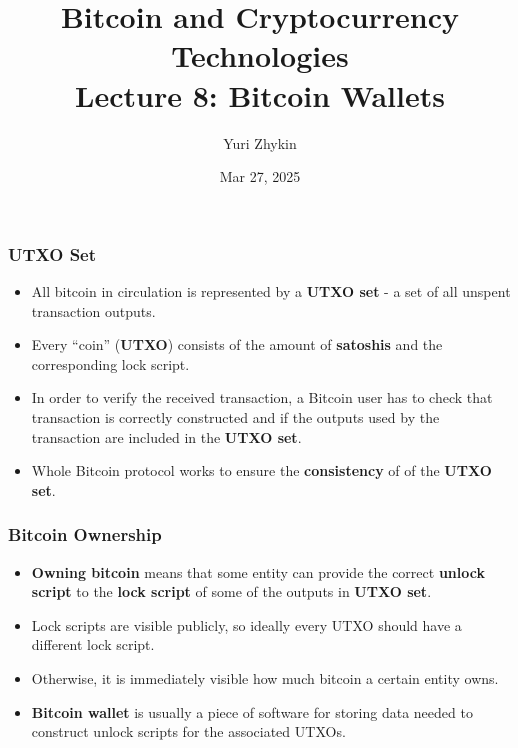 \documentclass{beamer}
\title{
  Bitcoin and Cryptocurrency Technologies \\
  Lecture 8: Bitcoin Wallets
}
\author{Yuri Zhykin}
\date{Mar 27, 2025}
\begin{document}
\frame{\titlepage}

\begin{frame}
  \frametitle{UTXO Set}
  \begin{itemize}
  \item All bitcoin in circulation is represented by a \textbf{UTXO set} - a set
    of all unspent transaction outputs.
  \item Every ``coin'' (\textbf{UTXO}) consists of the amount of
    \textbf{satoshis} and the corresponding lock script.
  \item In order to verify the received transaction, a Bitcoin user has to check
    that transaction is correctly constructed and if the outputs used by the
    transaction are included in the \textbf{UTXO set}.
  \item Whole Bitcoin protocol works to ensure the \textbf{consistency} of of
    the \textbf{UTXO set}.
  \end{itemize}
\end{frame}

\begin{frame}
  \frametitle{Bitcoin Ownership}
  \begin{itemize}
  \item \textbf{Owning bitcoin} means that some entity can provide the correct
    \textbf{unlock script} to the \textbf{lock script} of some of the outputs in
    \textbf{UTXO set}.
  \item Lock scripts are visible publicly, so ideally every UTXO should have a
    different lock script.
  \item Otherwise, it is immediately visible how much bitcoin a certain entity
    owns.
  \item \textbf{Bitcoin wallet} is usually a piece of software for storing data
    needed to construct unlock scripts for the associated UTXOs.
  \end{itemize}
\end{frame}
\end{document}
